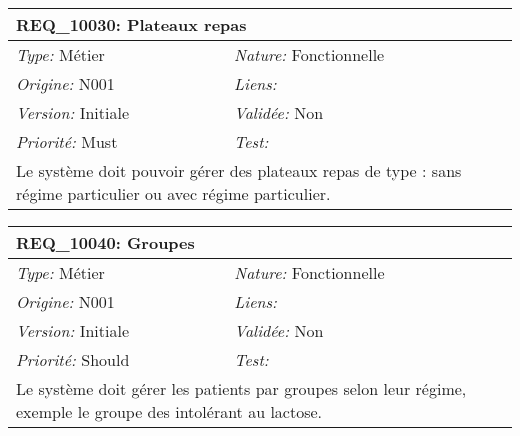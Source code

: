 \begin{table}[!ht]

\begin{tabular}{|p{60mm}p{100mm}|}

\hline

\multicolumn{2}{|l|}{\textbf{REQ\_10030:} Plateaux repas} \\ \hline

\emph{Type:} Métier & \emph{Nature:} Fonctionnelle \\

\emph{Origine:} N001 & \emph{Liens:}  \\

\emph{Version:} Initiale & \emph{Validée:} Non \\

\emph{Priorité:} Must & \emph{Test:} \\ \hline

\multicolumn{2}{|p{16cm}|}{Le système doit pouvoir gérer des plateaux repas de type : sans régime particulier ou avec régime particulier.} \\ \hline

\end{tabular}

\end{table}



\begin{table}[!ht]

\begin{tabular}{|p{60mm}p{100mm}|}

\hline

\multicolumn{2}{|l|}{\textbf{REQ\_10040:} Groupes} \\ \hline

\emph{Type:} Métier & \emph{Nature:} Fonctionnelle \\

\emph{Origine:} N001 & \emph{Liens:}  \\

\emph{Version:} Initiale & \emph{Validée:} Non \\

\emph{Priorité:} Should & \emph{Test:} \\ \hline

\multicolumn{2}{|p{16cm}|}{Le système doit gérer les patients par groupes selon leur régime, exemple le groupe des intolérant au lactose.} \\ \hline

\end{tabular}

\end{table}




